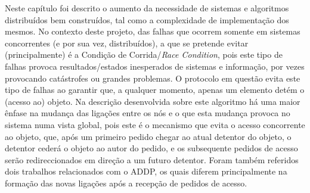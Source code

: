 Neste capítulo foi descrito o aumento da necessidade de sistemas e algoritmos distribuídos bem construídos, tal como a complexidade de implementação dos mesmos.
No contexto deste projeto, das falhas que ocorrem somente em sistemas concorrentes (e por sua vez, distribuídos), a que se pretende evitar (principalmente)
é a Condição de Corrida/\emph{Race Condition},
pois este tipo de falhas provoca resultados/estados inesperados de sistemas e informação, por vezes provocando catástrofes ou grandes problemas.
O protocolo em questão evita este tipo de falhas ao garantir que, a qualquer momento, apenas um elemento detém o (acesso ao) objeto.
Na descrição desenvolvida sobre este algoritmo há uma maior ênfase na mudança das ligações entre os nós e o que esta mudança provoca no sistema numa vista global,
pois este é o mecanismo que evita o acesso concorrente ao objeto, que, após um primeiro pedido chegar ao atual detentor do objeto, o detentor cederá o objeto ao autor do pedido,
e os subsequente pedidos de acesso serão redireccionados em direção a um futuro detentor.
Foram também referidos dois trabalhos relacionados com o \acs*{ADDP}, os quais diferem principalmente na formação das novas ligações após a recepção de pedidos de acesso.

